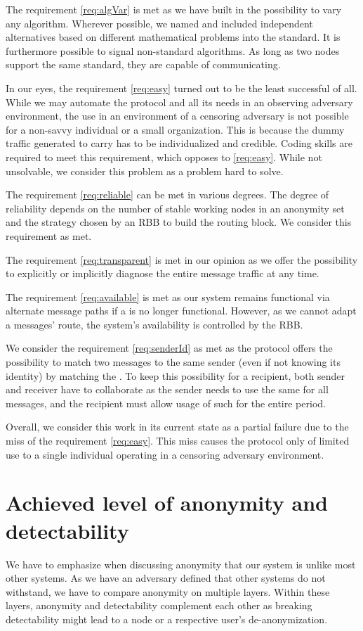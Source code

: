 The requirement \ref{req:algVar} is met as we have built in the possibility to vary any algorithm. Wherever possible, we named and included independent alternatives based on different mathematical problems into the standard. It is furthermore possible to signal non-standard algorithms. As long as two nodes support the same standard, they are capable of communicating.

In our eyes, the requirement \ref{req:easy} turned out to be the least successful of all. While we may automate the \MessageVortex{} protocol and all its needs in an observing adversary environment, the use in an environment of a censoring adversary is not possible for a non-savvy individual or a small organization. This is because the dummy traffic generated to carry \VortexMessages{} has to be individualized and credible. Coding skills are required to meet this requirement, which opposes to \ref{req:easy}. While not unsolvable, we consider this problem as a problem hard to solve.

The requirement \ref{req:reliable} can be met in various degrees. The degree of reliability depends on the number of stable working nodes in an anonymity set and the strategy chosen by an RBB to build the routing block. We consider this requirement as met. 

The requirement \ref{req:transparent} is met in our opinion as we offer the possibility to explicitly or implicitly diagnose the entire message traffic at any time. 

The requirement \ref{req:available} is met as our system remains functional via alternate message paths if a \VortexNode{} is no longer functional. However, as we cannot adapt a messages' route, the system's availability is controlled by the RBB.

We consider the requirement \ref{req:senderId} as met as the protocol offers the possibility to match two messages to the same sender (even if not knowing its identity) by matching the . To keep this possibility for a recipient, both sender and receiver have to collaborate as the sender needs to use the same  for all messages, and the recipient must allow usage of such  for the entire period.

Overall, we consider this work in its current state as a partial failure due to the miss of the requirement \ref{req:easy}. This miss causes the protocol only of limited use to a single individual operating in a censoring adversary environment.

\section{Achieved level of anonymity and detectability}
We have to emphasize when discussing anonymity that our system is unlike most other systems. As we have an adversary defined that other systems do not withstand, we have to compare anonymity on multiple layers. Within these layers, anonymity and detectability complement each other as breaking detectability might lead to a node or a respective user's de-anonymization. 


